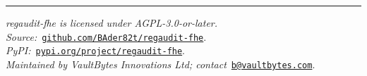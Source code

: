 \documentclass[10pt,a4paper]{article}
\begin{document}
\medskip
\noindent\rule{\linewidth}{0.4pt}\smallskip

\noindent\textit{regaudit-fhe is licensed under AGPL-3.0-or-later.}\\
\textit{Source:}~\href{https://github.com/BAder82t/regaudit-fhe}{\nolinkurl{github.com/BAder82t/regaudit-fhe}}.\\
\textit{PyPI:}~\href{https://pypi.org/project/regaudit-fhe/}{\nolinkurl{pypi.org/project/regaudit-fhe}}.\\
\textit{Maintained by VaultBytes Innovations Ltd; contact}~\href{mailto:b@vaultbytes.com}{\nolinkurl{b@vaultbytes.com}}.
\end{document}
